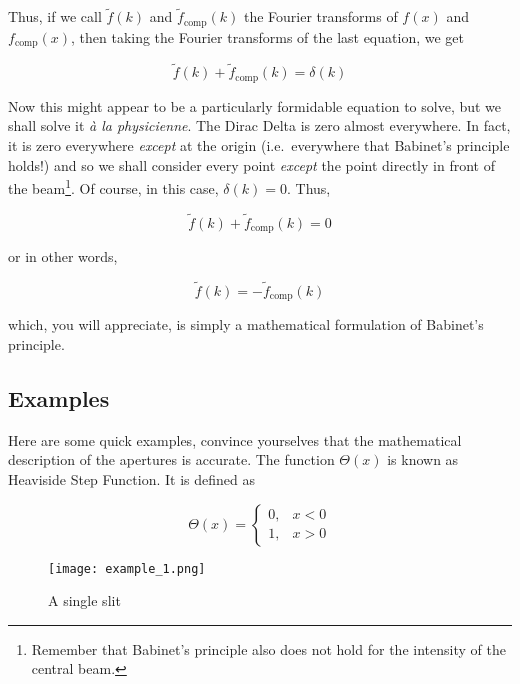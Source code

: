 Thus, if we call $\widetilde{f}(k)$ and $\widetilde{f}_\text{comp}(k)$ the Fourier transforms of $f(x)$ and $f_\text{comp}(x)$, then taking the Fourier transforms of the last equation, we get

\begin{equation*}
\widetilde{f}(k) + \widetilde{f}_\text{comp}(k) = \delta(k)
\end{equation*}

Now this might appear to be a particularly formidable equation to solve, but we shall solve it \textit{à la physicienne}. The Dirac Delta is zero almost everywhere. In fact, it is zero everywhere \textit{except} at the origin (i.e.\ everywhere that Babinet's principle holds!) and so we shall consider every point \textit{except} the point directly in front of the beam\footnote{Remember that Babinet's principle also does not hold for the intensity of the central beam.}. Of course, in this case, $\delta(k) = 0$. Thus,

\begin{equation*}
\widetilde{f}(k) + \widetilde{f}_\text{comp}(k) = 0
\end{equation*}

or in other words,

\begin{equation*}
\widetilde{f}(k) = - \widetilde{f}_\text{comp}(k)
\end{equation*}

which, you will appreciate, is simply a mathematical formulation of Babinet's principle.

\subsection{Examples}

Here are some quick examples, convince yourselves that the mathematical description of the apertures is accurate. The function $\Theta(x)$ is known as Heaviside Step Function. It is defined as

\begin{equation*}
\Theta (x) = \begin{cases}
              0, & x < 0\\
              1, & x > 0
             \end{cases}
\end{equation*}


\begin{figure}[!htb]
\centering
\texttt{[image: example\_1.png]}
\caption{A single slit}
\label{example_1}
\end{figure}

